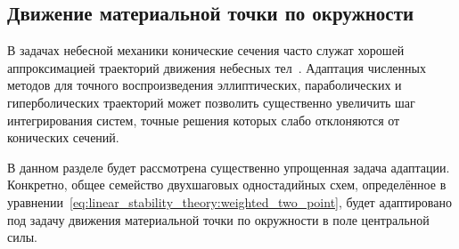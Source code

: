 \subsection{Движение материальной точки по окружности}
\label{subsection:methods:circular_orbit}

В задачах небесной механики конические сечения часто служат
хорошей аппроксимацией траекторий движения небесных тел~\cite{landau2022mechanics}.
Адаптация численных методов для точного воспроизведения эллиптических, параболических и гиперболических траекторий
может позволить существенно увеличить шаг интегрирования систем,
точные решения которых слабо отклоняются от конических сечений.

В данном разделе будет рассмотрена существенно упрощенная задача адаптации.
Конкретно, общее семейство двухшаговых одностадийных схем,
определённое в уравнении~\eqref{eq:linear_stability_theory:weighted_two_point},
будет адаптировано под задачу движения материальной точки по окружности в поле центральной силы.

